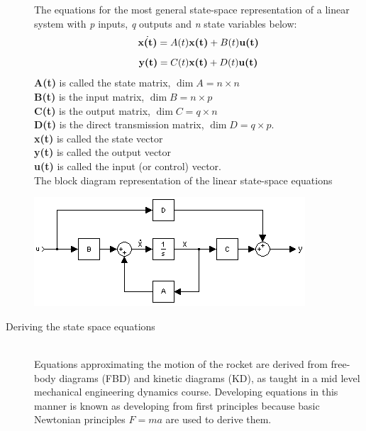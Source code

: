 \documentclass[12pt]{article}
\begin{document}
\begin{description}
		The equations for the most general state-space representation of a linear system with \textit{p} inputs, \textit{q} outputs and \textit{n} state variables below:\\
			\begin{equation}
				\dot{\textbf{x(t)}} = A(t)\textbf{x(t)} + B(t)\textbf{u(t)}\\
			\end{equation}
			\begin{equation}
				\textbf{y(t)} = C(t)\textbf{x(t)} + D(t)\textbf{u(t)}\\
			\end{equation}
		\textbf{A(t)} is called the state matrix, $\dim{A} = n \times n$\\
		\textbf{B(t)} is the input matrix, $\dim{B} = n \times p$\\
		\textbf{C(t)} is the output matrix, $\dim{C} = q \times n$\\
		\textbf{D(t)} is the direct transmission matrix, $\dim{D} = q \times p$.\\
		\textbf{x(t)} is called the state vector\\
		\textbf{y(t)} is called the output vector\\
		\textbf{u(t)} is called the input (or control) vector.\\


		\newpage		
		The block diagram representation of the linear state-space equations
		\begin{center}
			\includegraphics[scale=1]{Typical_State_Space_model.png}\\
		\end{center}

		\item [Deriving the state space equations] \hfill \\
		Equations approximating the motion of the rocket are derived from free-body diagrams (FBD) and kinetic diagrams (KD), as taught in a mid level mechanical engineering dynamics course. Developing equations in this manner is known as developing from first principles because basic Newtonian principles $F=ma$ are used to derive them. \cite{PSAS} \\
		

\end{description}
\end{document}
